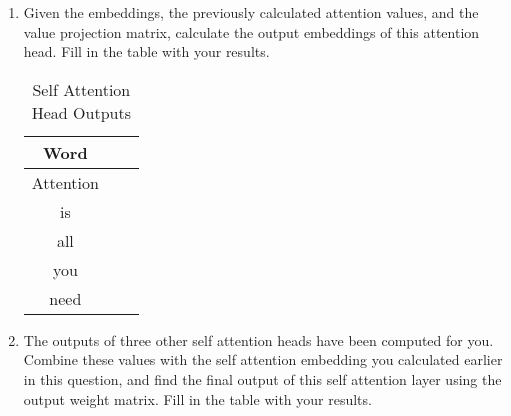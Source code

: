 \documentclass[12pt, letterpaper]{article}
\begin{document}
\begin{enumerate}
\item Given the embeddings, the previously calculated attention values, and the value projection matrix, calculate the output embeddings of this attention head. Fill in the table with your results. 

\begin{table}[H]
\begin{center}
\begin{tabular}{ |c|c|c| } 
\hline
 Word  &  \multicolumn{1}{c}{} \hspace{0.5cm}  &   \hspace{0.5cm}  \\
\hline
Attention &    &   \\
\hline
is        &    &  \\
\hline
all       &    &   \\
\hline
you       &    &   \\
\hline
need      &    &   \\
\hline
\end{tabular}
\caption{Self Attention Head Outputs}
\end{center}
\end{table}

\item The outputs of three other self attention heads have been computed for you. Combine these values with the self attention embedding you calculated earlier in this question, and find the final output of this self attention layer using the output weight matrix. Fill in the table with your results.


\end{enumerate}
\end{document}
